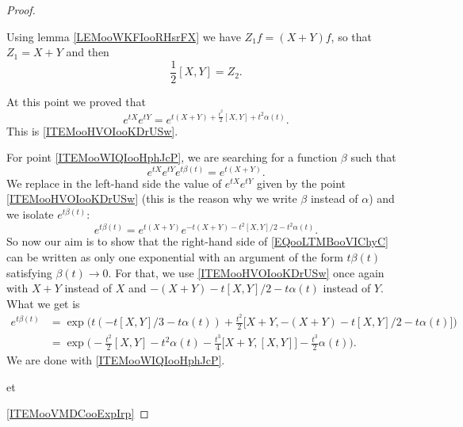 \begin{proof}
\begin{subproof}
            Using lemma \ref{LEMooWKFIooRHsrFX} we have \( Z_1f=(X+Y)f\), so that \( Z_1=X+Y\) and then
            \begin{equation}
                \frac{ 1 }{2}[X,Y]=Z_2.
            \end{equation}
    \end{subproof}
    At this point we proved that
    \begin{equation}
        e^{tX} e^{tY}= e^{t(X+Y)+\frac{ t^2 }{2}[X,Y]+t^2\alpha(t)}.
    \end{equation}
    This is \ref{ITEMooHVOIooKDrUSw}.

    For point \ref{ITEMooWIQIooHphJcP}, we are searching for a function \( \beta\) such that 
    \begin{equation}
        e^{tX} e^{tY} e^{t\beta(t)}= e^{t(X+Y)}.
    \end{equation}
    We replace in the left-hand side the value of \(  e^{tX} e^{tY}\) given by the point \ref{ITEMooHVOIooKDrUSw} (this is the reason why we write \( \beta\) instead of \( \alpha\)) and we isolate \(  e^{t\beta(t)}\):
    \begin{equation}        \label{EQooLTMBooVIChyC}
        e^{t\beta(t)}= e^{t(X+Y)} e^{-t(X+Y)-t^2[X,Y]/2-t^2\alpha(t)}.
    \end{equation}
    So now our aim is to show that the right-hand side of \eqref{EQooLTMBooVIChyC} can be written as only one exponential with an argument of the form \( t\beta(t)\) satisfying \( \beta(t)\to 0\). For that, we use \ref{ITEMooHVOIooKDrUSw} once again with \( X+Y\) instead of \( X\) and \( -(X+Y)-t[X,Y]/2-t\alpha(t)\) instead of \( Y\). What we get is
    \begin{subequations}
        \begin{align}
            e^{t\beta(t)}&=\exp\big( t(-t[X,Y]/3-t\alpha(t))+\frac{ t^2 }{2}\big[ X+Y,-(X+Y)-t[X,Y]/2-t\alpha(t) \big] \big)\\
            &=\exp\big( -\frac{ t^2 }{2}[X,Y]  -t^2\alpha(t)-\frac{ t^3 }{ 4 }\big[ X+Y,[X,Y] \big]-\frac{ t^3 }{ 2 }\alpha(t)  \big).
        \end{align}
    \end{subequations}
    We are done with \ref{ITEMooWIQIooHphJcP}.

et

    \ref{ITEMooVMDCooExpIrp}

\end{proof}


